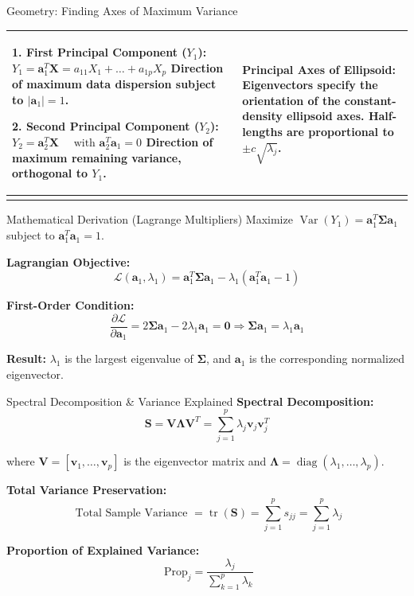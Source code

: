 \documentclass[aspectratio=169,ignorenonframetext]{beamer}
\begin{document}
\begin{frame}{Geometry: Finding Axes of Maximum Variance}
{\def\LTcaptype{none} %
\begin{longtable}[]{@{}
  >{\raggedright\arraybackslash}p{}
  >{\raggedright\arraybackslash}p{}@{}}
\toprule\noalign{}
\endhead
\textbf{1. First Principal Component (\(Y_{1}\)):}
\(Y_{1} = \mathbf{a}_{1}^{T}\mathbf{X} = a_{11}X_{1} + \ldots + a_{1p}X_{p}\)
Direction of maximum data dispersion subject to
\(|\mathbf{a}_{1}| = 1\).

\textbf{2. Second Principal Component (\(Y_{2}\)):}
\(Y_{2} = \mathbf{a}_{2}^{T}\mathbf{X}\quad\text{ with  }\mathbf{a}_{2}^{T}\mathbf{a}_{1} = 0\)
Direction of maximum remaining variance, orthogonal to \(Y_{1}\). &
\textbf{Principal Axes of Ellipsoid:} Eigenvectors specify the
orientation of the constant-density ellipsoid axes. Half-lengths are
proportional to \(\pm c\sqrt{\lambda_{j}}\). \\
\bottomrule\noalign{}
\end{longtable}
}
\end{frame}

\begin{frame}{Mathematical Derivation (Lagrange Multipliers)}
Maximize
\(\operatorname{Var}(Y_{1}) = \mathbf{a}_{1}^{T}\mathbf{\Sigma}\mathbf{a}_{1}\)
subject to \(\mathbf{a}_{1}^{T}\mathbf{a}_{1} = 1\).

\textbf{Lagrangian Objective:}
\[\mathcal{L}(\mathbf{a}_{1},\lambda_{1}) = \mathbf{a}_{1}^{T}\mathbf{\Sigma}\mathbf{a}_{1} - \lambda_{1}\left( \mathbf{a}_{1}^{T}\mathbf{a}_{1} - 1 \right)\]

\textbf{First-Order Condition:}
\[\frac{\partial\mathcal{L}}{\partial\mathbf{a}_{1}} = 2\mathbf{\Sigma}\mathbf{a}_{1} - 2\lambda_{1}\mathbf{a}_{1} = \mathbf{0} \Longrightarrow \mathbf{\Sigma}\mathbf{a}_{1} = \lambda_{1}\mathbf{a}_{1}\]

\textbf{Result:} \(\lambda_{1}\) is the largest eigenvalue of
\(\mathbf{\Sigma}\), and \(\mathbf{a}_{1}\) is the corresponding
normalized eigenvector.
\end{frame}

\begin{frame}{Spectral Decomposition \& Variance Explained}
\textbf{Spectral Decomposition:}
\[\mathbf{S} = \mathbf{V}\mathbf{\Lambda}\mathbf{V}^{T} = \sum_{j = 1}^{p}\lambda_{j}\mathbf{v}_{j}\mathbf{v}_{j}^{T}\]

where
\(\mathbf{V} = \left\lbrack \mathbf{v}_{1},\ldots,\mathbf{v}_{p} \right\rbrack\)
is the eigenvector matrix and
\(\mathbf{\Lambda} = \operatorname{diag}(\lambda_{1},\ldots,\lambda_{p})\).

\textbf{Total Variance Preservation:}
\[\text{ Total Sample Variance } = \operatorname{tr}(\mathbf{S}) = \sum_{j = 1}^{p}s_{jj} = \sum_{j = 1}^{p}\lambda_{j}\]

\textbf{Proportion of Explained Variance:}
\[\text{ Prop}_{j} = \frac{\lambda_{j}}{\sum_{k = 1}^{p}\lambda_{k}}\]
\end{frame}
\end{document}
